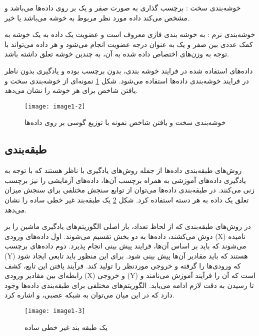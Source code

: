 \noindent
خوشه‌بندی سخت : برچسب گذاری به صورت صفر و یک بر روی داده‌ها می‌باشد و مشخص می‌كند داده مورد نظر مربوط به خوشه می‌باشد یا خیر.

\noindent
خوشه‌بندی نرم : به خوشه بندی فازی معروف است و عضویت یک داده به یک خوشه به کمک عددی بین صفر و یک به عنوان درجه عضویت انجام می‌شود و هر داده می‌تواند با توجه به وزن‌های اختصاص داده شده به آن، به چندین خوشه تعلق داشته باشد.

\noindent
داده‌های استفاده شده در فرایند خوشه بندی، بدون برچسب بوده و یادگیری بدون ناظر  در فرایند خوشه‌بندی داده‌ها استفاده می‌شود. شكل \ref{image1-2} نمونه‌ای از خوشه‌بندی سخت و یافتن شاخص برای هر خوشه را نشان می‌دهد.
\begin{figure}[!h]
\centering
\texttt{[image: image1-2]}
\caption{ خوشه‌بندی سخت و یافتن شاخص نمونه با توزیع گوسی بر روی داده‌ها }
\label{image1-2}
\end{figure}

\subsection{طبقه‌بندی}
روش‌های طبقه‌بندی  داده‌ها از جمله روش‌های یادگیری با ناظر  هستند که با توجه به یادگیری داده‌های آموزشی به همراه برچسب آن‌ها، داده‌های آزمایشی را نیز برچسب زنی می‌کنند. در طبقه‌بندی داده‌ها می‌توان از توابع سنجش مختلفی برای سنجش میزان تعلق یک داده به هر دسته استفاده کرد. شکل \ref{image1-3} یک طبقه‌بند غیر خطی ساده را نشان می‌دهد.

\noindent
در روش‌های طبقه‌بندی که از لحاظ تعداد، بار اصلی الگوریتم‌های یادگیری ماشین را بر دوش می‌کشند، داده‌ها به دو بخش تقسیم می‌شوند. اول داده‌های ورودی (X) نامیده می‌شوند که باید بر اساس آن‌ها، فرایند پیش بینی انجام پذیرد. دوم داده‌های برچسب (Y) هستند که باید مقادیر آن‌ها پیش بینی شود. برای این منظور باید تابعی ایجاد شود که ورودی‌ها را گرفته و خروجی موردنظر را تولید کند. فرآیند یافتن این تابع، کشف رابطه‌ای بین مقادیر ورودی (X) و خروجی (Y) است که آن را فرآیند آموزش می‌نامند و تا رسیدن به دقت لازم ادامه می‌یابد. الگوریتم‌های مختلفی برای طبقه‌بندی داده‌ها وجود دارد که در این میان می‌توان به شبکه عصبی،    و   اشاره کرد.

\begin{figure}[h]
\centering
\texttt{[image: image1-3]}
\caption{ یک طبقه بند غیر خطی ساده }
\label{image1-3}
\end{figure}

